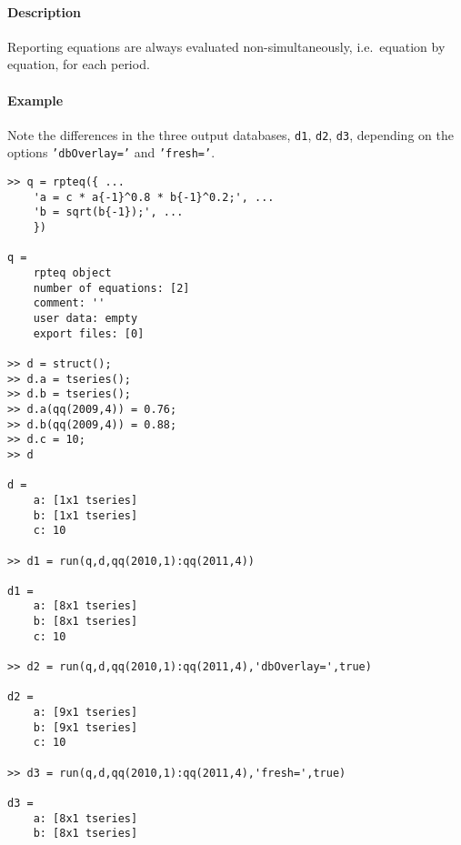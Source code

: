 \paragraph{Description}

Reporting equations are always evaluated non-simultaneously,
i.e.~equation by equation, for each period.

\paragraph{Example}

Note the differences in the three output databases, \texttt{d1},
\texttt{d2}, \texttt{d3}, depending on the options \texttt{'dbOverlay='}
and \texttt{'fresh='}.

\begin{verbatim}
>> q = rpteq({ ...
    'a = c * a{-1}^0.8 * b{-1}^0.2;', ...
    'b = sqrt(b{-1});', ...
    })

q =
    rpteq object
    number of equations: [2]
    comment: ''
    user data: empty
    export files: [0]

>> d = struct();
>> d.a = tseries();
>> d.b = tseries();
>> d.a(qq(2009,4)) = 0.76;
>> d.b(qq(2009,4)) = 0.88;
>> d.c = 10;
>> d

d = 
    a: [1x1 tseries]
    b: [1x1 tseries]
    c: 10

>> d1 = run(q,d,qq(2010,1):qq(2011,4))

d1 = 
    a: [8x1 tseries]
    b: [8x1 tseries]
    c: 10

>> d2 = run(q,d,qq(2010,1):qq(2011,4),'dbOverlay=',true)

d2 = 
    a: [9x1 tseries]
    b: [9x1 tseries]
    c: 10

>> d3 = run(q,d,qq(2010,1):qq(2011,4),'fresh=',true)

d3 = 
    a: [8x1 tseries]
    b: [8x1 tseries]
\end{verbatim}


